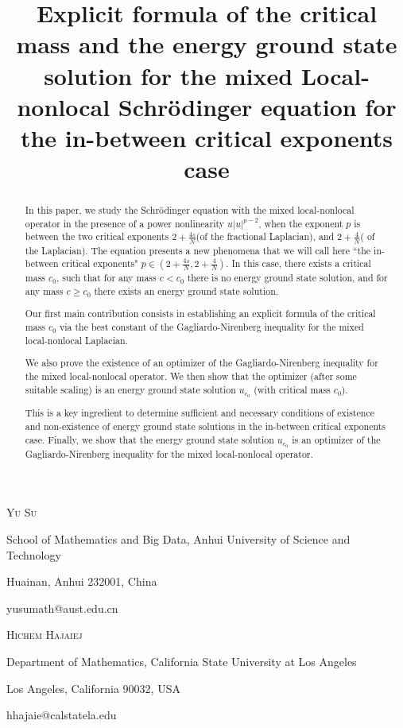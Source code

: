 \documentclass[12pt,a4paper,reqno]{amsart}
\title[Schr\"{o}dinger equation for the in-between critical exponents case]
{Explicit formula of the critical mass and the energy ground state solution for the mixed Local-nonlocal Schr\"{o}dinger equation for the in-between critical exponents case}
\numberwithin{equation}{section}
\begin{document}
\maketitle


\centerline{\scshape Yu Su}
\medskip
{\footnotesize
\centerline{School of Mathematics and Big Data, Anhui University of Science and Technology}
\centerline{Huainan, Anhui 232001, China}
\centerline{yusumath@aust.edu.cn}
}


\centerline{\scshape Hichem Hajaiej}
\medskip
{\footnotesize
\centerline{Department of Mathematics, California State University at Los Angeles}
\centerline{Los Angeles, California 90032, USA}
\centerline{hhajaie@calstatela.edu}
}


\begin{abstract}
In this paper,
we study the Schr\"{o}dinger equation with the mixed local-nonlocal operator in the presence of a power nonlinearity $u|u|^{p-2}$, when the exponent $p$ is between the two critical exponents $2+\frac{4s}{N}$(of the fractional Laplacian), and $2+\frac{4}{N}$( of the Laplacian). The equation presents a new phenomena that we will call here ``the in-between critical exponents" $p\in(2+\frac{4s}{N},2+\frac{4}{N}).$
In this case, there exists a critical mass $c_{0}$, such that for any mass $c<c_{0}$ there is no energy ground state solution, and for any mass $c\geqslant c_{0}$ there exists an energy ground state solution.

Our first main contribution consists in establishing an explicit formula of the critical mass $c_{0}$ via the best constant of the Gagliardo-Nirenberg inequality for the mixed local-nonlocal Laplacian.


We also prove the existence of an optimizer of the Gagliardo-Nirenberg inequality for the mixed local-nonlocal operator.
We then show that the optimizer (after some suitable scaling) is an energy ground state solution $u_{c_{0}}$ (with critical mass $c_{0}$).

This is a key ingredient to determine sufficient and necessary conditions of existence and non-existence of energy ground state solutions in the in-between critical exponents case.
Finally,
we show that the energy ground state solution $u_{c_{0}}$ is an optimizer of the Gagliardo-Nirenberg inequality for the mixed local-nonlocal operator.
\end{abstract}
\end{document}
